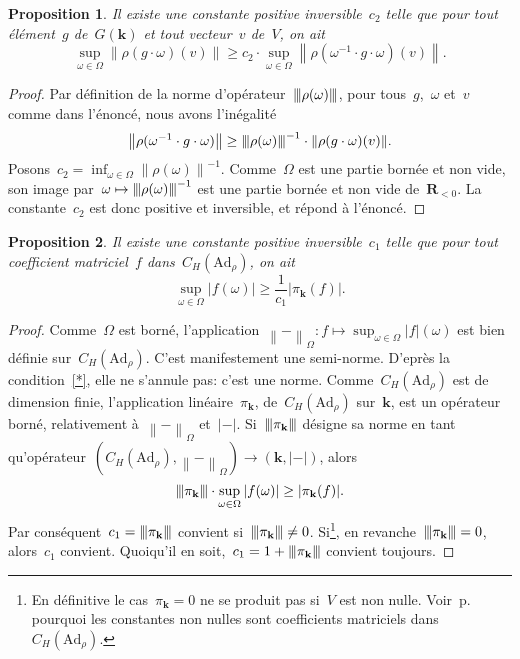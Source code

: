 \documentclass[french]{amsart}
\newcommand{\kk}{\mathbf{k}}
\newcommand{\abs}[1]{{\left|{#1}\right|}}
\newcommand{\Ad}{\mathrm{Ad}}
\newcommand{\lie}[1]{{\mathfrak{#1}}}
\newcommand{\Nm}[1]{{\left\|{#1}\right\|}}
\newcommand{\R}{\mathbf{R}}
\newtheorem{proposition}{Proposition}[section]
\newcommand{\NM}[1]{{\left\vert\kern-0.25ex\left\vert\kern-0.25ex\left\vert #1 
    \right\vert\kern-0.25ex\right\vert\kern-0.25ex\right\vert}}
\begin{document}
\begin{proposition}\label{prop31}\label{Prop31}
Il existe une constante positive inversible~$c_2$ telle que pour tout élément~$g$ de~$G(\kk)$ et tout vecteur~$v$ de~$V$, on ait
\begin{equation}\label{eq3}
\sup_{\omega\in\Omega}\Nm{\rho(g\cdot \omega)(v)}
	\geq
c_2\cdot\sup_{\omega\in\Omega}\Nm{\rho(\omega^{-1}\cdot g\cdot \omega)(v)}.
\end{equation}
\end{proposition}
\begin{proof} Par définition de la norme d'opérateur~$\NM{\rho(\omega)}$, pour tous~$g$,~$\omega$ et~$v$ comme dans l'énoncé, nous avons l'inégalité
\begin{equation}\label{eq4}
\Nm{\rho(\omega^{-1}\cdot g\cdot\omega)}
\geq
\NM{\rho(\omega)}^{-1}\cdot\Nm{\rho(g\cdot\omega)(v)}.
\end{equation}
Posons~$c_2=\inf_{\omega\in\Omega}\Nm{\rho(\omega)}^{-1}$. Comme~$\Omega$ est une partie bornée et non vide, son image par~$\omega\mapsto\NM{\rho(\omega)}^{-1}$ est une partie bornée et non vide de~$\R_{<0}$. La constante~$c_2$ est donc positive et inversible, et répond à l'énoncé.
\end{proof}
\begin{proposition}\label{prop32}\label{Prop32}
Il existe une constante positive inversible~$c_1$ telle que pour tout coefficient matriciel~$f$ dans~$C_H(\Ad_\rho)$, on ait
\begin{equation}\label{eq5}
\sup_{\omega\in\Omega}\abs{f(\omega)}\geq\frac{1}{c_1}\abs{\pi_\lie{\kk}(f)}.
\end{equation}
\end{proposition}
\begin{proof} Comme~$\Omega$ est borné, l'application~$\Nm{-}_\Omega:f\mapsto \sup_{\omega\in\Omega}\abs{f}(\omega)$ est bien définie sur~$C_H(\Ad_\rho)$. C'est manifestement une semi-norme. D'eprès la condition~\eqref{*}, elle ne s'annule pas: c'est une norme. Comme~$C_H(\Ad_\rho)$ est de dimension finie, l'application linéaire~$\pi_\kk$, de~$C_H(\Ad_\rho)$ sur~$\kk$, est un opérateur borné, relativement à~$\Nm{-}_\Omega$ et~$\abs{-}$. Si~$\NM{\pi_\kk}$ désigne sa norme en tant qu’opérateur~$(C_H(\Ad_\rho),\Nm{-}_\Omega)\to (\kk,\abs{-})$, alors
\begin{equation}\label{eq6}
\NM{\pi_\kk} \cdot \sup_{\omega\in\Omega}\abs{f(\omega)} \geq \abs{\pi_\kk(f)}.
\end{equation}
Par conséquent~$c_1=\NM{\pi_\kk}$ convient si~$\NM{\pi_\kk}\neq0$. Si\footnote{En définitive le cas~$\pi_\kk=0$ ne se produit pas si~$V$ est non nulle. Voir~p.\,\pageref{constantes coeffs} pourquoi les constantes non nulles sont coefficients matriciels dans~$C_H(\Ad_\rho)$.}, en revanche~$\NM{\pi_\kk}=0$, alors~$c_1$ convient. Quoiqu'il en soit,~$c_1=1+\NM{\pi_\kk}$ convient toujours.
\end{proof}
\end{document}
